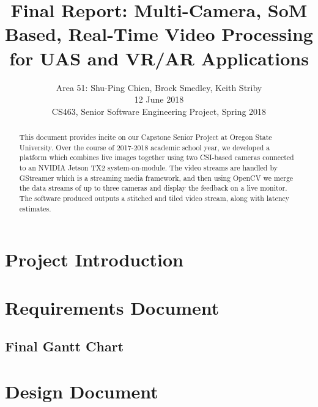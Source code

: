 \documentclass[letterpaper,10pt,serif,draftclsnofoot,onecolumn,compsoc,titlepage]{IEEEtran}
\title{Final Report: Multi-Camera, SoM Based, Real-Time Video Processing for UAS and VR/AR Applications}
\author{Area 51: Shu-Ping Chien, Brock Smedley, Keith Striby \\ 12 June 2018 \\ CS463, Senior Software Engineering Project, Spring 2018}
\begin{document}
\begin{titlepage}
\maketitle

\begin{abstract}

This document provides incite on our Capstone Senior Project at Oregon State University. 
Over the course of 2017-2018 academic school year, we developed a platform which combines 
live images together using two CSI-based cameras connected to an NVIDIA Jetson TX2 
system-on-module. The video streams are handled by GStreamer which is a streaming media 
framework, and then using OpenCV we merge the data streams of up to three cameras and 
display the feedback on a live monitor. The software produced outputs a stitched and 
tiled video stream, along with latency estimates. \\

\thispagestyle{empty}
\end{abstract}
\end{titlepage}

\newpage
\tableofcontents

\newpage

\section{Project Introduction}

	

\newpage

\section{Requirements Document}

	
\newpage

\subsection{Final Gantt Chart}

	

\newpage

\section{Design Document}

	
\end{document}
